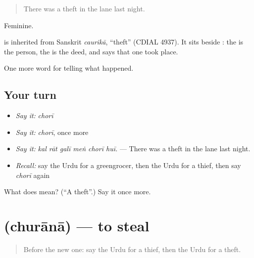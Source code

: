 \begin{quote}
There was a theft in the lane last night.
\end{quote}

Feminine.

\begin{cousinweb}
is inherited from Sanskrit \emph{caurikā}, \textquotedblleft{}theft\textquotedblright{} (CDIAL 4937). It sits beside \textbf{}: the \textbf{} is the person, the \textbf{} is the deed, and \textbf{ } says that one took place.
\end{cousinweb}

\begin{grammarlens}[title={What you've built}]
One more word for telling what happened.
\end{grammarlens}

\subsection*{Your turn}
\begin{itemize}
\raggedright
  \item \emph{Say it:} \emph{chorī}
  \item \emph{Say it:} \emph{chorī}, once more
  \item \emph{Say it:} \emph{kal rāt galī meṅ chorī huī.} — There was a theft in the lane last night.
  \item \emph{Recall:} say the Urdu for a greengrocer, then the Urdu for a thief, then say \emph{chorī} again
\end{itemize}

\begin{tcolorbox}[breakable,colback=teal!4,colframe=teal!35!black,title={Before you move on}]
What does  mean? (\textquotedblleft{}A theft\textquotedblright{}.) Say it once more.
\end{tcolorbox}
\section[\texorpdfstring{\ur{چرانا} (churānā)}{چرانا (churānā)}]{ (churānā) — to steal}

\label{lesson:UR-C276-churana}



\begin{quote}
Before the new one: say the Urdu for a thief, then the Urdu for a theft.
\end{quote}

